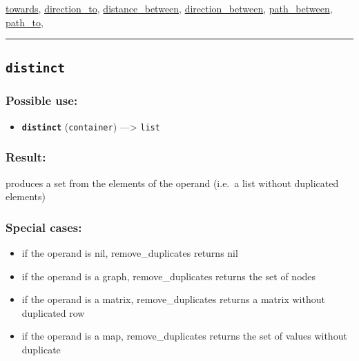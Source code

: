 \documentclass[]{book}
\providecommand{\tightlist}{%
  \setlength{\itemsep}{0pt}\setlength{\parskip}{0pt}}
\theoremstyle{definition}
\theoremstyle{definition}
\theoremstyle{definition}
\theoremstyle{remark}
\begin{document}
\href{operators-s-to-z.html\#towards}{towards},
\href{operators-d-to-h.html\#direction_to}{direction\_to},
\href{operators-d-to-h.html\#distance_between}{distance\_between},
\href{operators-d-to-h.html\#direction_between}{direction\_between},
\href{operators-n-to-r.html\#path_between}{path\_between},
\href{operators-n-to-r.html\#path_to}{path\_to},

\begin{center}\rule{0.5\linewidth}{\linethickness}\end{center}

\subsection{\texorpdfstring{\texttt{distinct}}{distinct}}\label{distinct}

\subsubsection{Possible use:}\label{possible-use-137}

\begin{itemize}
\tightlist
\item
  \textbf{\texttt{distinct}} (\texttt{container}) ---\textgreater{}
  \texttt{list}
\end{itemize}

\subsubsection{Result:}\label{result-133}

produces a set from the elements of the operand (i.e.~a list without
duplicated elements)

\subsubsection{Special cases:}\label{special-cases-51}

\begin{itemize}
\tightlist
\item
  if the operand is nil, remove\_duplicates returns nil\\
\item
  if the operand is a graph, remove\_duplicates returns the set of
  nodes\\
\item
  if the operand is a matrix, remove\_duplicates returns a matrix
  without duplicated row\\
\item
  if the operand is a map, remove\_duplicates returns the set of values
  without duplicate
\end{itemize}
\end{document}
